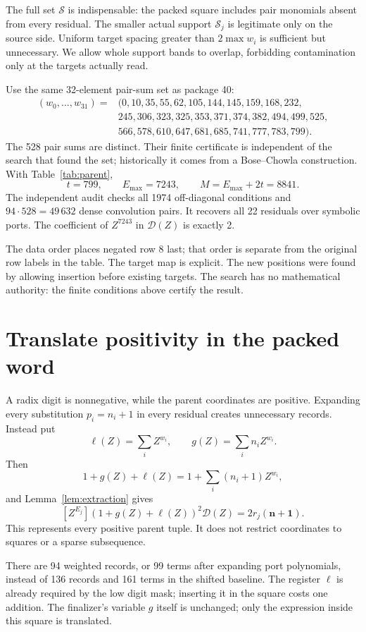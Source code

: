 \documentclass[11pt,letterpaper]{article}
\theoremstyle{remark}\newtheorem{remark}[theorem]{Remark}
\begin{document}
The full set $\mathcal S$ is indispensable: the packed square includes
pair monomials absent from every residual. The smaller actual support
$\mathcal S_j$ is legitimate only on the source side. Uniform target
spacing greater than $2\max w_i$ is sufficient but unnecessary. We allow
whole support bands to overlap, forbidding contamination only at the
targets actually read.

Use the same 32-element pair-sum set as package 40:
\begin{align*}
(w_0,\ldots,w_{31})={}&(0,10,35,55,62,105,144,145,159,168,232,\\
&245,306,323,325,353,371,374,382,494,499,525,\\
&566,578,610,647,681,685,741,777,783,799).
\end{align*}
The 528 pair sums are distinct. Their finite certificate is independent
of the search that found the set; historically it comes from a
Bose--Chowla construction. With Table~\ref{tab:parent},
\[
t=799,\qquad E_{\max}=7243,\qquad M=E_{\max}+2t=8841.
\]
The independent audit checks all 1974 off-diagonal conditions and
$94\cdot528=49\,632$ dense convolution pairs. It recovers all 22 residuals
over symbolic ports. The coefficient of $Z^{7243}$ in $\mathcal D(Z)$ is exactly 2.

The data order places negated row 8 last; that order is separate from
the original row labels in the table. The target map is explicit.
The new positions were found by allowing insertion before existing
targets. The search has no mathematical authority: the finite conditions
above certify the result.

\section{Translate positivity in the packed word}
A radix digit is nonnegative, while the parent coordinates are positive.
Expanding every substitution $p_i=n_i+1$ in every residual creates
unnecessary records. Instead put
\[
\ell(Z)=\sum_i Z^{w_i},\qquad g(Z)=\sum_i n_iZ^{w_i}.
\]
Then
\[
1+g(Z)+\ell(Z)=1+\sum_i(n_i+1)Z^{w_i},
\]
and Lemma~\ref{lem:extraction} gives
\begin{equation}\label{eq:positivepack}
[Z^{E_j}](1+g(Z)+\ell(Z))^2\mathcal D(Z)
=2r_j(\mathbf n+\mathbf1).
\end{equation}
This represents every positive parent tuple. It does not restrict
coordinates to squares or a sparse subsequence.

There are 94 weighted records, or 99 terms after expanding port
polynomials, instead of 136 records and 161 terms in the shifted baseline.
The register $\ell$ is already required by the low digit mask; inserting
it in the square costs one addition. The finalizer's variable $g$ itself
is unchanged; only the expression inside this square is translated.
\end{document}
